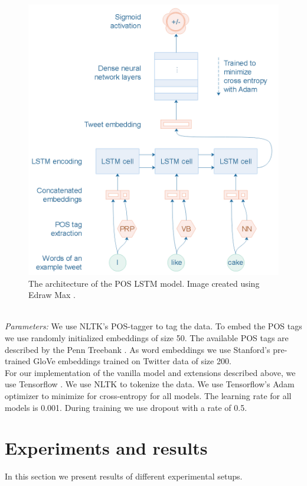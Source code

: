 \documentclass[conference]{IEEEtran}
\newcommand{\Glove}{GloVe }
\begin{document}
	\begin{figure}[h!]
    	\centering 
		\includegraphics[scale=0.7]{fig/cil_model_pos}
		\caption{The architecture of the POS LSTM model. Image created using Edraw Max \cite{Edraw}.}
		\label{fig:pos_model}
	\end{figure}\\
\indent \textit{Parameters:} We use NLTK's \cite{NLTK} POS-tagger to tag the data. To embed the POS tags we use randomly initialized embeddings of size 50. The available POS tags are described by the Penn Treebank \cite{TREEBANK}. As word embeddings we use Stanford's pre-trained \Glove embeddings trained on Twitter data of size 200.\\
\indent For our implementation of the vanilla model and extensions described above, we use Tensorflow \cite{tensorflow}.  We use NLTK \cite{NLTK} to tokenize the data. We use Tensorflow's Adam optimizer to minimize for cross-entropy for all models. The learning rate for all models is 0.001. During training we use dropout with a rate of 0.5.
	\section{Experiments and results}
	\label{sec:results}
	In this section we present results of different experimental setups.
\end{document}
